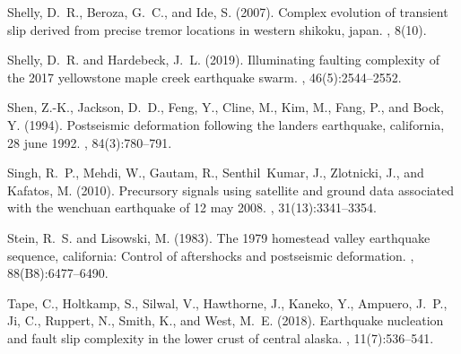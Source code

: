 \documentclass[a4paper,12pt,twoside]{article}
\begin{document}
\begin{thebibliography}{}
Shelly, D.~R., Beroza, G.~C., and Ide, S. (2007).
\newblock Complex evolution of transient slip derived from precise tremor
  locations in western shikoku, japan.
, 8(10).

Shelly, D.~R. and Hardebeck, J.~L. (2019).
\newblock Illuminating faulting complexity of the 2017 yellowstone maple creek
  earthquake swarm.
, 46(5):2544--2552.

Shen, Z.-K., Jackson, D.~D., Feng, Y., Cline, M., Kim, M., Fang, P., and Bock,
  Y. (1994).
\newblock Postseismic deformation following the landers earthquake, california,
  28 june 1992.
,
  84(3):780--791.

Singh, R.~P., Mehdi, W., Gautam, R., Senthil~Kumar, J., Zlotnicki, J., and
  Kafatos, M. (2010).
\newblock Precursory signals using satellite and ground data associated with
  the wenchuan earthquake of 12 may 2008.
, 31(13):3341--3354.

Stein, R.~S. and Lisowski, M. (1983).
\newblock The 1979 homestead valley earthquake sequence, california: Control of
  aftershocks and postseismic deformation.
,
  88(B8):6477--6490.

Tape, C., Holtkamp, S., Silwal, V., Hawthorne, J., Kaneko, Y., Ampuero, J.~P.,
  Ji, C., Ruppert, N., Smith, K., and West, M.~E. (2018).
\newblock Earthquake nucleation and fault slip complexity in the lower crust of
  central alaska.
, 11(7):536--541.

\protect{}
\end{thebibliography}
\end{document}
